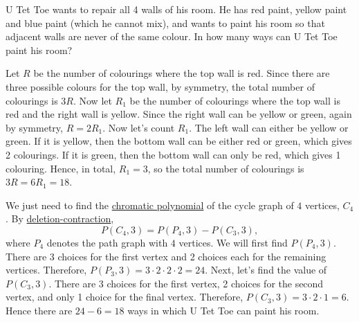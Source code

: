\begin{question}
    U Tet Toe wants to repair all 4 walls of his room. He has red paint, yellow
    paint and blue paint (which he cannot mix), and wants to paint his room so
    that adjacent walls are never of the same colour. In how many ways can U
    Tet Toe paint his room?
\end{question}
\begin{solution}[1]
    Let $R$ be the number of colourings where the top wall is red. Since there
    are three possible colours for the top wall, by symmetry, the total number
    of colourings is $3R$. Now let $R_1$ be the number of colourings where the
    top wall is red and the right wall is yellow. Since the right wall can be
    yellow or green, again by symmetry, $R = 2R_1$. Now let's count $R_1$. The
    left wall can either be yellow or green. If it is yellow, then the bottom
    wall can be either red or green, which gives 2 colourings. If it is green,
    then the bottom wall can only be red, which gives 1 colouring. Hence, in
    total, $R_1 = 3$, so the total number of colourings is $3R = 6R_1 = 18$.
\end{solution}
\begin{solution}[2]
    We just need to find the \hyperref[def: chromaticpoly]{chromatic
    polynomial} of the cycle graph of $4$ vertices, $C_4$. By \hyperref[teq:
    DC]{deletion-contraction},
    \[ P(C_4, 3) = P(P_4, 3) - P(C_3, 3), \]
    where $P_4$ denotes the path graph with $4$ vertices. We will first find
    $P(P_4, 3)$. There are 3 choices for the first vertex and 2 choices each for
    the remaining vertices. Therefore, $P(P_3, 3) = 3 \cdot 2 \cdot 2 \cdot 2 =
    24$. Next, let's find the value of $P(C_3, 3)$. There are 3 choices for the
    first vertex, 2 choices for the second vertex, and only 1 choice for the
    final vertex. Therefore, $P(C_3, 3) = 3 \cdot 2 \cdot 1 = 6$. Hence there
    are $24 - 6 = 18$ ways in which U Tet Toe can paint his room. 
\end{solution}

